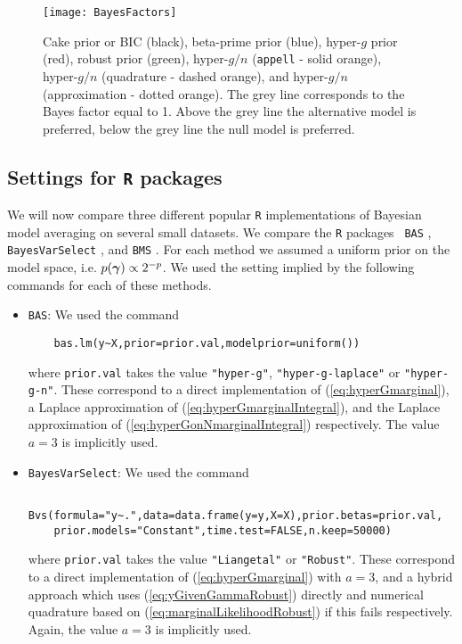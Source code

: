 {\begin{figure}[h!]
	\centering
	\texttt{[image: BayesFactors]}
	\caption{Cake prior or BIC (black), 
		beta-prime prior (blue), 
		hyper-$g$ prior (red),
		robust prior (green),
		hyper-$g/n$ ({\tt appell} - solid orange),
		hyper-$g/n$ (quadrature - dashed orange), 
		and hyper-$g/n$ (approximation - dotted orange). The grey line corresponds to the Bayes factor equal to 1. Above the grey line the alternative model is preferred, below the grey line the null model is preferred.}
	\label{fig:bayesfactors}
\end{figure}

\subsection{Settings for {\tt R} packages} 

We will now compare three different popular {\tt R} implementations of Bayesian
model averaging on several small datasets. We compare the {\tt R} packages {\tt
BAS} \citep{Clyde2017}, {\tt BayesVarSelect} \citep{Garcia-Donato2016}, and
{\tt BMS} \citep{Zeugner2015}. For each method we assumed a uniform prior on
the model space, i.e. $p({\boldsymbol \gamma})\propto 2^{-p}$. We used the setting implied
by the following commands for each of these methods.
\begin{itemize}
	\item {\tt BAS}: We used the command
	\begin{verbatim}
	bas.lm(y~X,prior=prior.val,modelprior=uniform())
	\end{verbatim}
	
    where \verb|prior.val| takes the value \verb|"hyper-g"|,
    \verb|"hyper-g-laplace"| or \verb|"hyper-g-n"|.  These correspond to a
    direct implementation of (\ref{eq:hyperGmarginal}), a Laplace approximation
    of (\ref{eq:hyperGmarginalIntegral}), and the Laplace approximation of
    (\ref{eq:hyperGonNmarginalIntegral}) respectively. The value $a=3$ is
    implicitly used.
	
	\item {\tt BayesVarSelect}: We used the command
	\begin{verbatim}
	Bvs(formula="y~.",data=data.frame(y=y,X=X),prior.betas=prior.val,
	prior.models="Constant",time.test=FALSE,n.keep=50000)
	\end{verbatim}
	
	
    \noindent where \verb|prior.val| takes the value \verb|"Liangetal"| or
    \verb|"Robust"|.  These correspond to a direct implementation of
    (\ref{eq:hyperGmarginal}) with $a=3$, and a hybrid approach which uses
    (\ref{eq:yGivenGammaRobust}) directly and numerical quadrature based on
    (\ref{eq:marginalLikelihoodRobust}) if this fails respectively.  Again, the
    value $a=3$ is implicitly used.
	

\end{itemize}}
